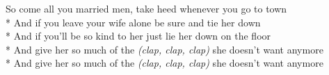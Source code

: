 \begin{SongText}
\begin{SongVerse}
    \end{SongVerse}
    \begin{SongVerse}
        So come all you married men, take heed whenever you go to town\\*%
        And if you leave your wife alone be sure and tie her down\\*%
        And if you'll be so kind to her just lie her down on the floor\\*%
        And give her so much of the \emph{(clap, clap, clap)} she doesn't want anymore\\*%
        And give her so much of the \emph{(clap, clap, clap)} she doesn't want anymore
    \end{SongVerse}
\end{SongText}
